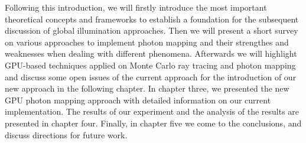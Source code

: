 Following this introduction, we will firstly introduce the most important theoretical concepts and frameworks to establish a foundation for the subsequent discussion of global illumination approaches. Then we will present a short survey on various approaches to implement photon mapping and their strengthes and weaknesses when dealing with different phenomena. Afterwards we will highlight GPU-based techniques applied on Monte Carlo ray tracing and photon mapping and discuss some open issues of the current approach for the introduction of our new approach in the following chapter.  In chapter three, we presented the new GPU photon mapping approach with detailed information on our current implementation. The results of our experiment and the analysis of the results are presented in chapter four. Finally, in chapter five we come to the conclusions, and discuss directions for future work. 
